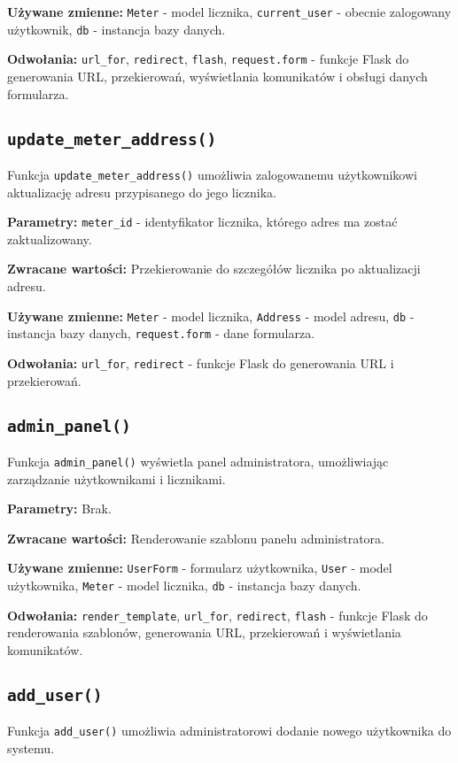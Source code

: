\documentclass[12pt,a4paper]{report}
\begin{document}
\textbf{Używane zmienne:} \texttt{Meter} - model licznika, \texttt{current\_user} - obecnie zalogowany użytkownik, \texttt{db} - instancja bazy danych.

\textbf{Odwołania:} \texttt{url\_for}, \texttt{redirect}, \texttt{flash}, \texttt{request.form} - funkcje Flask do generowania URL, przekierowań, wyświetlania komunikatów i obsługi danych formularza.

\subsection{\texttt{update\_meter\_address()}}
\label{sec:update_meter_address}
Funkcja \texttt{update\_meter\_address()} umożliwia zalogowanemu użytkownikowi aktualizację adresu przypisanego do jego licznika.

\textbf{Parametry:} \texttt{meter\_id} - identyfikator licznika, którego adres ma zostać zaktualizowany.

\textbf{Zwracane wartości:} Przekierowanie do szczegółów licznika po aktualizacji adresu.

\textbf{Używane zmienne:} \texttt{Meter} - model licznika, \texttt{Address} - model adresu, \texttt{db} - instancja bazy danych, \texttt{request.form} - dane formularza.

\textbf{Odwołania:} \texttt{url\_for}, \texttt{redirect} - funkcje Flask do generowania URL i przekierowań.

\subsection{\texttt{admin\_panel()}}
\label{sec:admin_panel}
Funkcja \texttt{admin\_panel()} wyświetla panel administratora, umożliwiając zarządzanie użytkownikami i licznikami.

\textbf{Parametry:} Brak.

\textbf{Zwracane wartości:} Renderowanie szablonu panelu administratora.

\textbf{Używane zmienne:} \texttt{UserForm} - formularz użytkownika, \texttt{User} - model użytkownika, \texttt{Meter} - model licznika, \texttt{db} - instancja bazy danych.

\textbf{Odwołania:} \texttt{render\_template}, \texttt{url\_for}, \texttt{redirect}, \texttt{flash} - funkcje Flask do renderowania szablonów, generowania URL, przekierowań i wyświetlania komunikatów.

\subsection{\texttt{add\_user()}}
\label{sec:add_user}
Funkcja \texttt{add\_user()} umożliwia administratorowi dodanie nowego użytkownika do systemu.
\end{document}
